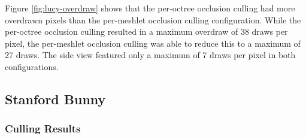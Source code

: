\noindent
Figure \ref{fig:lucy-overdraw} shows that the per-octree occlusion culling had more 
overdrawn pixels than the per-meshlet occlusion culling configuration. While the 
per-octree occlusion culling resulted in a maximum overdraw of 38 draws per pixel, 
the per-meshlet occlusion culling was able to reduce this to a maximum of 27 draws.
The side view featured only a maximum of 7 draws per pixel in both configurations.


\clearpage




\subsection*{Stanford Bunny}

\subsubsection*{Culling Results} \label{subsubsec-culling-results-bunny}


